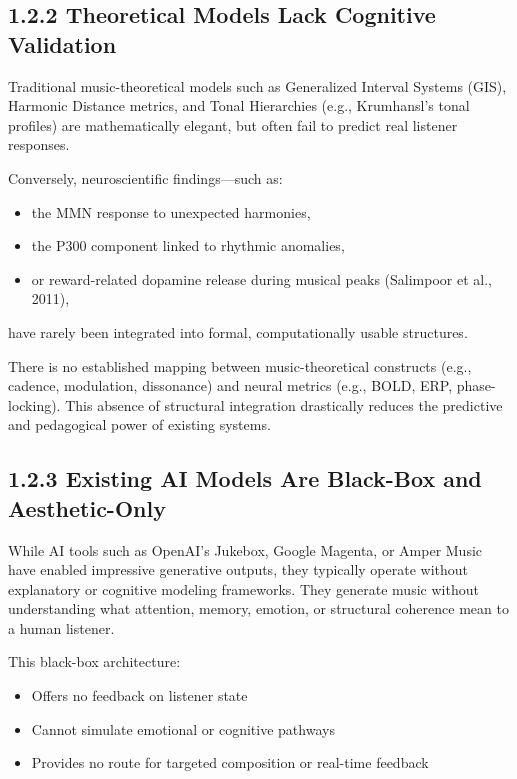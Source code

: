\documentclass[10pt]{article}
\begin{document}
\subsection*{1.2.2 Theoretical Models Lack Cognitive Validation}

Traditional music-theoretical models such as Generalized Interval Systems (GIS), Harmonic Distance metrics, and Tonal Hierarchies (e.g., Krumhansl’s tonal profiles) are mathematically elegant, but often fail to predict real listener responses.

Conversely, neuroscientific findings—such as:

\begin{itemize}
    \item the MMN response to unexpected harmonies,
    \item the P300 component linked to rhythmic anomalies,
    \item or reward-related dopamine release during musical peaks (Salimpoor et al., 2011),
\end{itemize}

have rarely been integrated into formal, computationally usable structures.

There is no established mapping between music-theoretical constructs (e.g., cadence, modulation, dissonance) and neural metrics (e.g., BOLD, ERP, phase-locking). This absence of structural integration drastically reduces the predictive and pedagogical power of existing systems.

\subsection*{1.2.3 Existing AI Models Are Black-Box and Aesthetic-Only}

While AI tools such as OpenAI’s Jukebox, Google Magenta, or Amper Music have enabled impressive generative outputs, they typically operate without explanatory or cognitive modeling frameworks. They generate music without understanding what attention, memory, emotion, or structural coherence mean to a human listener.

This black-box architecture:

\begin{itemize}
    \item Offers no feedback on listener state
    \item Cannot simulate emotional or cognitive pathways
    \item Provides no route for targeted composition or real-time feedback
\end{itemize}
\end{document}
